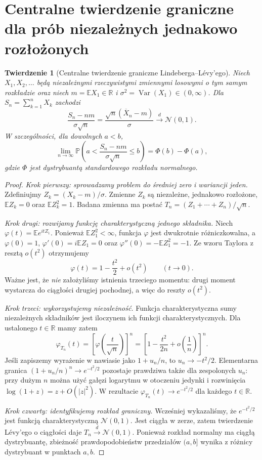 \documentclass[11pt,a4paper,oneside]{report}
\numberwithin{equation}{chapter}
\theoremstyle{plain}
\newtheorem{twierdzenie}{Twierdzenie}[chapter]
\theoremstyle{definition}
\theoremstyle{remark}
\newcommand{\R}{\mathbb{R}}
\newcommand{\Prob}{\mathbb{P}}
\newcommand{\E}{\mathbb{E}}
\newcommand{\Var}{\operatorname{Var}}
\newcommand{\Normal}{\mathcal{N}}
\begin{document}
\section{Centralne twierdzenie graniczne dla prób niezależnych jednakowo rozłożonych}

\begin{twierdzenie}[Centralne twierdzenie graniczne Lindeberga--Lévy'ego]
Niech $X_1,X_2,\ldots$ będą niezależnymi rzeczywistymi
zmiennymi losowymi o tym samym rozkładzie oraz niech
$m=\E X_1\in\R$ i
$\sigma^2=\Var(X_1)\in(0,\infty)$.
Dla $S_n=\sum_{k=1}^nX_k$ zachodzi
\[
\frac{S_n-nm}{\sigma\sqrt n}
=\frac{\sqrt n(\overline X_n-m)}{\sigma}
\xrightarrow{d}\Normal(0,1).
\]
W szczególności, dla dowolnych $a<b$,
\[
\lim_{n\to\infty}
\Prob\!\left(a<\frac{S_n-nm}{\sigma\sqrt n}\leq b\right)
=\Phi(b)-\Phi(a),
\]
gdzie $\Phi$ jest dystrybuantą standardowego rozkładu
normalnego.
\end{twierdzenie}
\begin{proof}
\emph{Krok pierwszy: sprowadzamy problem do średniej
zero i wariancji jeden.}
Zdefiniujmy $Z_k=(X_k-m)/\sigma$.
Zmienne $Z_k$ są niezależne, jednakowo rozłożone,
$\E Z_k=0$ oraz $\E Z_k^2=1$.
Badana zmienna ma postać
$T_n=(Z_1+\cdots+Z_n)/\sqrt n$.

\emph{Krok drugi: rozwijamy funkcję charakterystyczną
jednego składnika.} Niech $\varphi(t)=\E e^{itZ_1}$.
Ponieważ $\E Z_1^2<\infty$, funkcja $\varphi$ jest
dwukrotnie różniczkowalna, a
$\varphi(0)=1$, $\varphi'(0)=i\E Z_1=0$ oraz
$\varphi''(0)=-\E Z_1^2=-1$.
Ze wzoru Taylora z resztą $o(t^2)$ otrzymujemy
\[
\varphi(t)=1-\frac{t^2}{2}+o(t^2)
\qquad(t\to0).
\]
Ważne jest, że \emph{nie} założyliśmy istnienia
trzeciego momentu: drugi moment wystarcza do
ciągłości drugiej pochodnej, a więc do reszty $o(t^2)$.

\emph{Krok trzeci: wykorzystujemy niezależność.}
Funkcja charakterystyczna sumy niezależnych składników
jest iloczynem ich funkcji charakterystycznych.
Dla ustalonego $t\in\R$ mamy zatem
\[
\varphi_{T_n}(t)
=\left[\varphi\!\left(\frac{t}{\sqrt n}\right)\right]^n
=\left[1-\frac{t^2}{2n}+o\!\left(\frac1n\right)\right]^n.
\]
Jeśli zapiszemy wyrażenie w nawiasie jako
$1+u_n/n$, to $u_n\to-t^2/2$.
Elementarna granica $(1+u_n/n)^n\to e^{-t^2/2}$
pozostaje prawdziwa także dla zespolonych $u_n$:
przy dużym $n$ można użyć gałęzi logarytmu w
otoczeniu jedynki i rozwinięcia
$\log(1+z)=z+O(|z|^2)$.
W rezultacie
$\varphi_{T_n}(t)\to e^{-t^2/2}$ dla każdego $t\in\R$.

\emph{Krok czwarty: identyfikujemy rozkład graniczny.}
Wcześniej wykazaliśmy, że $e^{-t^2/2}$ jest
funkcją charakterystyczną $\Normal(0,1)$.
Jest ciągła w zerze, zatem twierdzenie Lévy'ego o
ciągłości daje $T_n\xrightarrow d\Normal(0,1)$.
Ponieważ rozkład normalny ma ciągłą dystrybuantę,
zbieżność prawdopodobieństw przedziałów $(a,b]$
wynika z różnicy dystrybuant w punktach $a,b$.
\end{proof}
\end{document}
